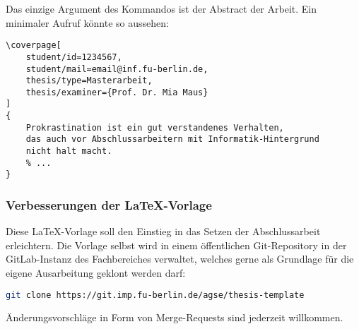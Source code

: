 Das einzige Argument des Kommandos ist der Abstract der Arbeit.
Ein minimaler Aufruf könnte so aussehen:
\begin{lstlisting}[language={[LaTeX]TeX}, morekeywords={coverpage}]
\coverpage[
    student/id=1234567,
    student/mail=email@inf.fu-berlin.de,
    thesis/type=Masterarbeit,
    thesis/examiner={Prof. Dr. Mia Maus}
]
{
    Prokrastination ist ein gut verstandenes Verhalten,
    das auch vor Abschlussarbeitern mit Informatik-Hintergrund
    nicht halt macht.
    % ...
}
\end{lstlisting}


\subsubsection{Verbesserungen der \LaTeX-Vorlage}

Diese \LaTeX-Vorlage soll den Einstieg in das Setzen der Abschlussarbeit
erleichtern.
Die Vorlage selbst wird in einem öffentlichen Git-Repository in der
GitLab-Instanz des Fachbereiches verwaltet, welches gerne als Grundlage für die
eigene Ausarbeitung geklont werden darf:
\begin{lstlisting}[language=bash]
git clone https://git.imp.fu-berlin.de/agse/thesis-template
\end{lstlisting}
Änderungsvorschläge in Form von Merge-Requests sind jederzeit willkommen.
